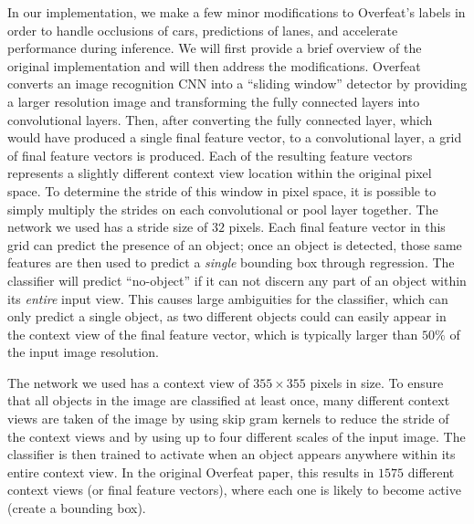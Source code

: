 \documentclass[journal]{IEEEtran}
\begin{document}
In our implementation, we make a few minor modifications to Overfeat's labels in order to handle occlusions of cars, predictions of lanes, and accelerate performance during inference. We will first provide a brief overview of the original implementation and will then address the modifications. Overfeat converts an image recognition CNN into a ``sliding window'' detector by providing a larger resolution image and transforming the fully connected layers into convolutional layers. Then, after converting the fully connected layer, which would have produced a single final feature vector, to a convolutional layer, a grid of final feature vectors is produced. Each of the resulting feature vectors represents a slightly different context view location within the original pixel space. To determine the stride of this window in pixel space, it is possible to simply multiply the strides on each convolutional or pool layer together. The network we used has a stride size of $32$ pixels. Each final feature vector in this grid can predict the presence of an object; once an object is detected, those same features are then used to predict a \textit{single} bounding box through regression. The classifier will predict ``no-object'' if it can not discern any part of an object within its \textit{entire} input view. This causes large ambiguities for the classifier, which can only predict a single object, as two different objects could can easily appear in the context view of the final feature vector, which is typically larger than $50\%$ of the input image resolution. 

The network we used has a context view of $355 \times 355$ pixels in size. To ensure that all objects in the image are classified at least once, many different context views are taken of the image by using skip gram kernels to reduce the stride of the context views and by using up to four different scales of the input image. The classifier is then trained to activate when an object appears anywhere within its entire context view. In the original Overfeat paper, this results in $1575$ different context views (or final feature vectors), where each one is likely to become active (create a bounding box).
\end{document}
